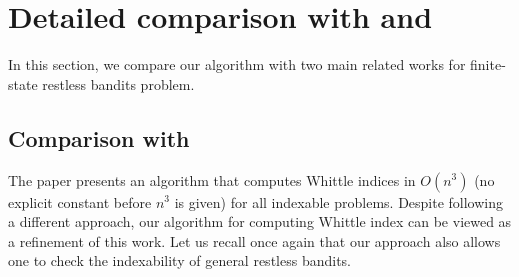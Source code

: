 \documentclass[acmsmall,screen,anonymous]{acmart}
\begin{document}
\section{Detailed comparison with \cite{akbarzadeh2020conditions} and \cite{nino2020fast}}
\label{apx:comparison}

In this section, we compare our algorithm with two main related works for finite-state restless bandits problem.

\subsection{Comparison with  \cite{akbarzadeh2020conditions}}
The paper presents an  algorithm that computes Whittle indices  in $O(n^3)$ (no explicit constant before $n^3$ is given) for all indexable problems. Despite following a different approach, our algorithm for computing Whittle index can be viewed as a refinement of this work. Let us recall once again that our approach also allows one to check the indexability of general restless bandits.
\end{document}
